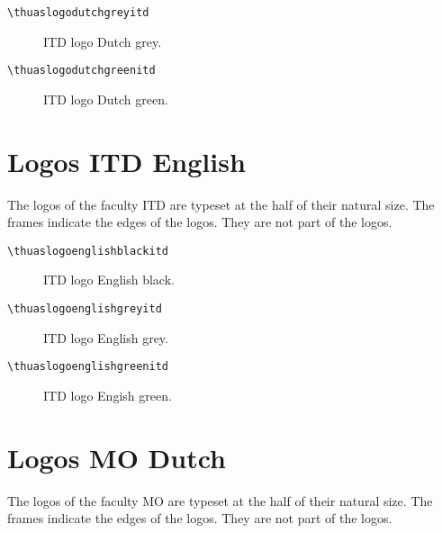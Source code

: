 \documentclass[a4paper,12pt]{article}
\begin{document}
\begin{verbatim}
\thuaslogodutchgreyitd
\end{verbatim}

\begin{figure}[H]
\centering\fboxsep=0pt%
\fbox{%
\scalebox{0.7071}{\thuaslogodutchgreyitd}}
\caption{ITD logo Dutch grey.}
\end{figure}

\begin{verbatim}
\thuaslogodutchgreenitd
\end{verbatim}

\begin{figure}[H]
\centering\fboxsep=0pt%
\fbox{%
\scalebox{0.7071}{\thuaslogodutchgreenitd}}
\caption{ITD logo Dutch green.}
\end{figure}


\section{Logos ITD English}
The logos of the faculty ITD are typeset at the half of their natural size.
The frames indicate the edges of the logos. They are not part of the logos.

\begin{verbatim}
\thuaslogoenglishblackitd
\end{verbatim}

\begin{figure}[H]
\centering\fboxsep=0pt%
\fbox{%
\scalebox{0.7071}{\thuaslogoenglishblackitd}}
\caption{ITD logo English black.}
\end{figure}

\begin{verbatim}
\thuaslogoenglishgreyitd
\end{verbatim}

\begin{figure}[H]
\centering\fboxsep=0pt%
\fbox{%
\scalebox{0.7071}{\thuaslogoenglishgreyitd}}
\caption{ITD logo English grey.}
\end{figure}

\begin{verbatim}
\thuaslogoenglishgreenitd
\end{verbatim}

\begin{figure}[H]
\centering\fboxsep=0pt%
\fbox{%
\scalebox{0.7071}{\thuaslogoenglishgreenitd}}
\caption{ITD logo Engish green.}
\end{figure}


\section{Logos MO Dutch}
The logos of the faculty MO are typeset at the half of their natural size.
The frames indicate the edges of the logos. They are not part of the logos.
\end{document}
